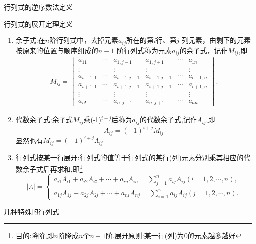 \documentclass[8pt a4paper, oneside, UTF8]{ctexbook}
\begin{document}
\begin{sloppypar}
\begin{defn}{行列式的逆序数法定义}{}
    \end{defn}
    \begin{defn}{行列式的展开定理定义}{}
        \begin{enumerate}
            \item 余子式:在$n$阶行列式中，去掉元素$a_{ij}$所在的第$i$行、第$j$ 列元素，由剩下的元素按原来的位置与顺序组成的$n-1$ 阶行列式称为元素$a_{ij}$的余子式，记作$M_{ij}$,即
            $$
                \begin{gathered}M_{ij}=\begin{vmatrix}a_{11}&\cdots&a_{1,j-1}&a_{1,j+1}&\cdots&a_{1n}\\\vdots&&\vdots&\vdots&&\vdots\\a_{i-1,1}&\cdots&a_{i-1,j-1}&a_{i-1,j+1}&\cdots&a_{i-1,n}\\a_{i+1,1}&\cdots&a_{i+1,j-1}&a_{i+1,j+1}&\cdots&a_{i+1,n}\\\vdots&&\vdots&\vdots&&\vdots\\a_{n!}&\cdots&a_{n,j-1}&a_{n,j+1}&\cdots&a_{nn}\end{vmatrix}.\end{gathered}
                $$
            \item 代数余子式:余子式$M_{ij}$乘(-1)$^{i+j}$后称为$a_{ij}$的代数余子式,记作$A_{ij}$,即$$A_{ij}=(-1)^{i+j}M_{ij}$$显然也有$M_{ij}=(-1)^{i+j}A_{ij}$
            \item 行列式按某一行展开:行列式的值等于行列式的某行(列)元素分别乘其相应的代数余子式后再求和,即\footnote{目的:降阶,即$n$阶降成$n$个$n-1$阶.展开原则:某一行(列)为$0$的元素越多越好}
            $$
                |A|=\begin{cases}a_{i1}A_{i1}+a_{i2}A_{i2}+\cdots+a_{in}A_{in}=\sum_{j=1}^{n}a_{ij}A_{ij}\left(i=1,2,\cdots,n\right),\\a_{1j}A_{1j}+a_{2j}A_{2j}+\cdots+a_{nj}A_{nj}=\sum_{i=1}^{n}a_{ij}A_{ij}\left(j=1,2,\cdots,n\right).\end{cases}
            $$
        \end{enumerate}
    \end{defn}
    \begin{criterion}{几种特殊的行列式}{}
        \begin{enumerate}

\end{enumerate}
\end{criterion}
\end{sloppypar}
\end{document}
